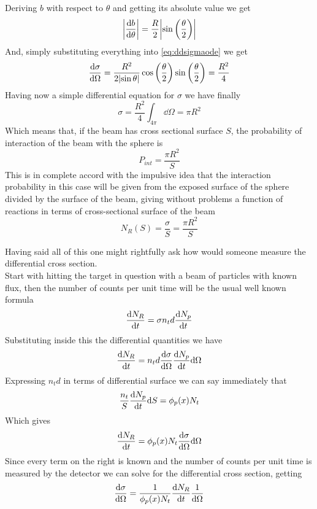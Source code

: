 \documentclass[../qm.tex]{subfiles}
\begin{document}
\begin{eg}
Deriving $b$ with respect to $\theta$ and getting its absolute value we get
\begin{equation*}
	\abs{\dv{b}{\theta}}=\frac{R}{2}\abs{\sin\left( \frac{\theta}{2} \right)}
\end{equation*}
And, simply substituting everything into \eqref{eq:ddsigmaode} we get
\begin{equation*}
	\dv{\sigma}{\Omega}=\frac{R^2}{2\abs{\sin\theta}}\cos\left( \frac{\theta}{2} \right)\sin\left( \frac{\theta}{2} \right)=\frac{R^2}{4}
\end{equation*}
Having now a simple differential equation for $\sigma$ we have finally
\begin{equation*}
	\sigma=\frac{R^2}{4}\int_{4\pi}^{}\dd\Omega=\pi R^2
\end{equation*}
Which means that, if the beam has cross sectional surface $S$, the probability of interaction of the beam with the sphere is
\begin{equation*}
	P_{int}=\frac{\pi R^2}{S}
\end{equation*}
This is in complete accord with the impulsive idea that the interaction probability in this case will be given from the exposed surface of the sphere divided by the surface of the beam, giving without problems a function of reactions in terms of cross-sectional surface of the beam
\begin{equation*}
	N_R(S)=\frac{\sigma}{S}=\frac{\pi R^2}{S}
\end{equation*}
\end{eg}
Having said all of this one might rightfully ask how would someone measure the differential cross section.\\
Start with hitting the target in question with a beam of particles with known flux, then the number of counts per unit time will be the usual well known formula
\begin{equation*}
	\dv{N_R}{t}=\sigma n_td\dv{N_p}{t}
\end{equation*}
Substituting inside this the differential quantities we have
\begin{equation*}
	\dv{N_R}{t}=n_td\dv{\sigma}{\Omega}\dv{N_p}{t}\dd\Omega
\end{equation*}
Expressing $n_td$ in terms of differential surface we can say immediately that
\begin{equation*}
	\frac{n_t}{S}\dv{N_p}{t}\dd S=\phi_p(x)N_t
\end{equation*}
Which gives
\begin{equation*}
	\dv{N_R}{t}=\phi_p(x)N_t\dv{\sigma}{\Omega}\dd\Omega
\end{equation*}
Since every term on the right is known and the number of counts per unit time is measured by the detector we can solve for the differential cross section, getting
\begin{equation}
	\dv{\sigma}{\Omega}=\frac{1}{\phi_p(x)N_t}\dv{N_R}{t}\frac{1}{\dd\Omega}
	\label{eq:measuredddcs}
\end{equation}
\end{document}
